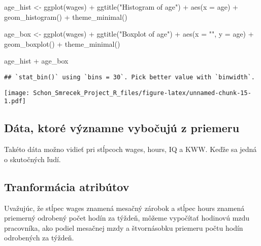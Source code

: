 \documentclass[
]{article}
\newenvironment{Shaded}{\begin{snugshade}}{\end{snugshade}}
\newcommand{\AttributeTok}[1]{\textcolor[rgb]{0.77,0.63,0.00}{#1}}
\newcommand{\FunctionTok}[1]{\textcolor[rgb]{0.00,0.00,0.00}{#1}}
\newcommand{\NormalTok}[1]{#1}
\newcommand{\OtherTok}[1]{\textcolor[rgb]{0.56,0.35,0.01}{#1}}
\newcommand{\SpecialCharTok}[1]{\textcolor[rgb]{0.00,0.00,0.00}{#1}}
\newcommand{\StringTok}[1]{\textcolor[rgb]{0.31,0.60,0.02}{#1}}
\begin{document}
\begin{Shaded}
\begin{Highlighting}[]
\NormalTok{age\_hist }\OtherTok{\textless{}{-}} \FunctionTok{ggplot}\NormalTok{(wages) }\SpecialCharTok{+} \FunctionTok{ggtitle}\NormalTok{(}\StringTok{"Histogram of age"}\NormalTok{) }\SpecialCharTok{+} \FunctionTok{aes}\NormalTok{(}\AttributeTok{x =}\NormalTok{ age) }\SpecialCharTok{+} \FunctionTok{geom\_histogram}\NormalTok{() }\SpecialCharTok{+} \FunctionTok{theme\_minimal}\NormalTok{()}

\NormalTok{age\_box }\OtherTok{\textless{}{-}} \FunctionTok{ggplot}\NormalTok{(wages) }\SpecialCharTok{+} \FunctionTok{ggtitle}\NormalTok{(}\StringTok{"Boxplot of age"}\NormalTok{) }\SpecialCharTok{+} \FunctionTok{aes}\NormalTok{(}\AttributeTok{x =} \StringTok{""}\NormalTok{, }\AttributeTok{y =}\NormalTok{ age) }\SpecialCharTok{+} \FunctionTok{geom\_boxplot}\NormalTok{() }\SpecialCharTok{+} \FunctionTok{theme\_minimal}\NormalTok{()}

\NormalTok{age\_hist }\SpecialCharTok{+}\NormalTok{ age\_box}
\end{Highlighting}
\end{Shaded}

\begin{verbatim}
## `stat_bin()` using `bins = 30`. Pick better value with `binwidth`.
\end{verbatim}

\texttt{[image: Schon\_Smrecek\_Project\_R\_files/figure-latex/unnamed-chunk-15-1.pdf]}

\hypertarget{duxe1ta-ktoruxe9-vuxfdznamne-vyboux10dujuxfa-z-priemeru}{%
\subsection{Dáta, ktoré významne vybočujú z
priemeru}\label{duxe1ta-ktoruxe9-vuxfdznamne-vyboux10dujuxfa-z-priemeru}}

Takéto dáta možno vidieť pri stĺpcoch wages, hours, IQ a KWW. Keďže sa
jedná o skutočných ľudí.

\hypertarget{tranformuxe1cia-atribuxfatov}{%
\subsection{Tranformácia atribútov}\label{tranformuxe1cia-atribuxfatov}}

Uvažujúc, že stĺpec wages znamená mesačný zárobok a stĺpec hours znamená
priemerný odrobený počet hodín za týždeň, môžeme vypočítať hodinovú mzdu
pracovníka, ako podiel mesačnej mzdy a štvornásobku priemeru počtu hodín
odrobených za týždeň.
\end{document}
